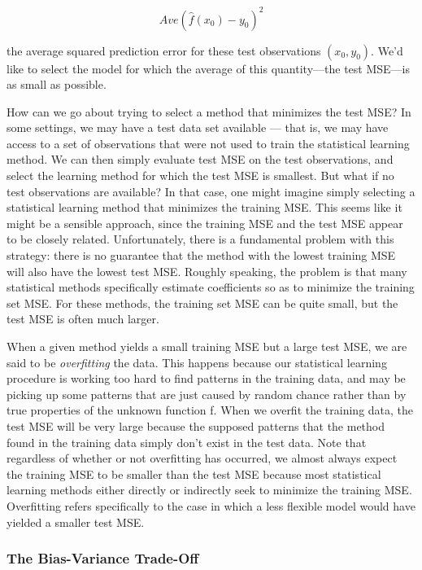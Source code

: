 \documentclass{article}
\theoremstyle{definition}
\theoremstyle{remark}
\begin{document}
	\[
	Ave(\hat{f}(x_0)-y_0)^2
	\]
	
	the average squared prediction error for these test observations $(x_0, y_0)$. We’d like to select the model for which the average of this quantity---the test MSE---is as small as possible.
	
	How can we go about trying to select a method that minimizes the test MSE? In some settings, we may have a test data set available — that is, we may have access to a set of observations that were not used to train the statistical learning method. We can then simply evaluate test MSE on the test observations, and select the learning method for which the test MSE is smallest. But what if no test observations are available? In that case, one might imagine simply selecting a statistical learning method that minimizes the training MSE. This seems like it might be a sensible approach, since the training MSE and the test MSE appear to be closely related. Unfortunately, there is a fundamental problem with this strategy: there is no guarantee that the method with the lowest training MSE will also have the lowest test MSE. Roughly speaking, the problem is that many statistical methods specifically estimate coefficients so as to minimize the training set MSE. For these methods, the training set MSE can be quite small, but the test MSE is often much larger.
	
	When a given method yields a small training MSE but a large test MSE, we are said to be \textit{overfitting} the data. This happens because our statistical learning procedure is working too hard to find patterns in the training data, and may be picking up some patterns that are just caused by random chance rather than by true properties of the unknown function f. When we overfit the training data, the test MSE will be very large because the supposed patterns that the method found in the training data simply don’t exist in the test data. Note that regardless of whether or not overfitting has occurred, we almost always expect the training MSE to be smaller than the test MSE because most statistical learning methods either directly or indirectly seek to minimize the training MSE. Overfitting refers specifically to the case in which a less flexible model would have yielded a smaller test MSE.
	
	\subsubsection*{The Bias-Variance Trade-Off}
	
\end{document}
